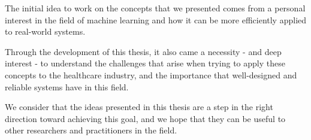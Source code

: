 \documentclass[../main.tex]{subfiles}
\begin{document}
    The initial idea to work on the concepts that we presented comes from a personal interest in the field of machine learning and how it can be more efficiently applied to real-world systems. 
    
    Through the development of this thesis, it also came a necessity - and deep interest - to understand the challenges that arise when trying to apply these concepts to the healthcare industry, and the importance that well-designed and reliable systems have in this field.
    
    We consider that the ideas presented in this thesis are a step in the right direction toward achieving this goal, and we hope that they can be useful to other researchers and practitioners in the field. 


    


\end{document}
